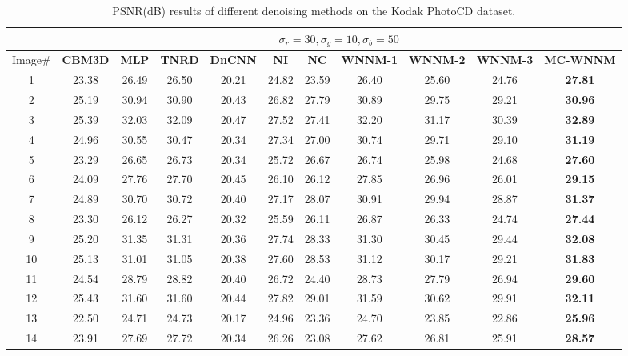 \begin{table}
\caption{PSNR(dB) results of different denoising methods on the Kodak PhotoCD dataset.}
\label{t2}
\begin{center}
\renewcommand\arraystretch{1.0}
\scriptsize
\begin{tabular}{|c||c|c|c|c|c|c|c|c|c|c|}
\hline
&\multicolumn{10}{c|}{ $\sigma_{r} = 30, \sigma_{g} = 10, \sigma_{b} = 50$}
\\
\hline
\hline
Image\#
&
\textbf{CBM3D}
&
\textbf{MLP}
&
\textbf{TNRD} 
&
\textbf{DnCNN}
&
\textbf{NI} 
&
\textbf{NC}
&
\textbf{WNNM-1} 
&
\textbf{WNNM-2}
&
\textbf{WNNM-3}
&
\textbf{MC-WNNM}
\\
\hline
1& 23.38 & 26.49 & 26.50 & 20.21 & 24.82 & 23.59 & 26.40 & 25.60 & 24.76 & \textbf{27.81}
\\
\hline
2& 25.19 & 30.94 & 30.90 & 20.43 & 26.82 & 27.79 & 30.89 & 29.75 & 29.21 & \textbf{30.96}
\\
\hline
3& 25.39 & 32.03 & 32.09 & 20.47 & 27.52 & 27.41 & 32.20 & 31.17 & 30.39 & \textbf{32.89}
\\
\hline 
4& 24.96 & 30.55 & 30.47 & 20.34 & 27.34 & 27.00 & 30.74 & 29.71 & 29.10 & \textbf{31.19} 
\\
\hline
5& 23.29 & 26.65 & 26.73 & 20.34 & 25.72 & 26.67 & 26.74 & 25.98 & 24.68 & \textbf{27.60}
\\
\hline
6& 24.09 & 27.76 & 27.70 & 20.45 & 26.10 & 26.12 & 27.85 & 26.96 & 26.01 & \textbf{29.15}
\\
\hline
7& 24.89 & 30.70 & 30.72 & 20.40 & 27.17 & 28.07 & 30.91 & 29.94 & 28.87 & \textbf{31.37} 
\\
\hline
8& 23.30 & 26.12 & 26.27 & 20.32 & 25.59 & 26.11 & 26.87 & 26.33 & 24.74 & \textbf{27.44}
\\
\hline
9& 25.20 & 31.35 & 31.31 & 20.36 & 27.74 & 28.33 & 31.30 & 30.45 & 29.44 & \textbf{32.08}
\\
\hline
10& 25.13 & 31.01 & 31.05 & 20.38 & 27.60 & 28.53 & 31.12 & 30.17 & 29.21 & \textbf{31.83}
\\
\hline
11& 24.54 & 28.79 & 28.82 & 20.40 & 26.72 & 24.40 & 28.73 & 27.79 & 26.94 & \textbf{29.60}
\\
\hline
12& 25.43 & 31.60 & 31.60 & 20.44 & 27.82 & 29.01 & 31.59 & 30.62 & 29.91 & \textbf{32.11}
\\
\hline
13& 22.50 & 24.71 & 24.73 & 20.17 & 24.96 & 23.36 & 24.70 & 23.85 & 22.86 & \textbf{25.96}
\\
\hline
14& 23.91 & 27.69 & 27.72 & 20.34 & 26.26 & 23.08 & 27.62 & 26.81 & 25.91 & \textbf{28.57}

\end{tabular}
\end{center}
\end{table}
